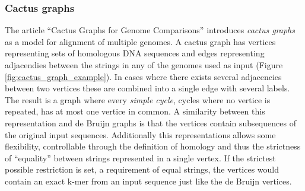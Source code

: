 \documentclass[thesis.tex]{subfiles}
\begin{document}
\subsubsection{Cactus graphs}
The article ``Cactus Graphs for Genome Comparisons''\cite{cactus_graphs_for_genome_comparisons} introduces \textit{cactus graphs} as a model for alignment of multiple genomes. A cactus graph has vertices representing sets of homologous DNA sequences and edges representing adjacendies between the strings in any of the genomes used as input (Figure \ref{fig:cactus_graph_example}). In cases where there exists several adjacencies between two vertices these are combined into a single edge with several labels. The result is a graph where every \textit{simple cycle}, cycles where no vertice is repeated, has at most one vertice in common. A similarity between this representation and de Bruijn graphs is that the vertices contain subsequences of the original input sequences. Additionally this representations allows some flexibility, controllable through the definition of homology and thus the strictness of ``equality'' between strings represented in a single vertex. If the strictest possible restriction is set, a requirement of equal strings, the vertices would contain an exact k-mer from an input sequence just like the de Bruijn vertices.
\end{document}
